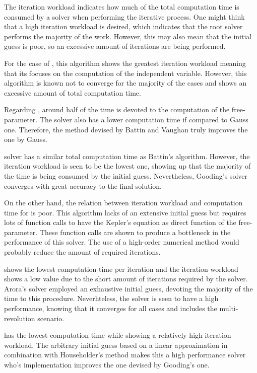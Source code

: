 The iteration workload indicates how much of the total computation time is
consumed by a solver when performing the iterative process. One might think that
a high iteration workload is desired, which indicates that the root solver
performs the majority of the work. However, this may also mean that the
initial guess is poor, so an excessive amount of iterations are being performed.

For the case of \cite{gauss1809}, this algorithm shows the greatest iteration
workload meaning that its focuses on the computation of the independent
variable. However, this algorithm is known not to converge for the majority of
the cases and shows an excessive amount of total computation time.

Regarding \cite{battin1984}, around half of the time is devoted to the
computation of the free-parameter. The solver also has a lower computation time
if compared to Gauss one. Therefore, the method devised by Battin and Vaughan
truly improves the one by Gauss.

\cite{gooding1990} solver has a similar total computation time as Battin's
algorithm. However, the iteration workload is seen to be the lowest one, showing
up that the majority of the time is being consumed by the initial guess.
Nevertheless, Gooding's solver converges with great accuracy to the final
solution.

On the other hand, the relation between iteration workload and computation time
for \cite{avanzini2008} is poor. This algorithm lacks of an extensive initial
guess but requires lots of function calls to have the Kepler's equation as
direct function of the free-parameter. These function calls are shown to produce
a bottleneck in the performance of this solver. The use of a high-order
numerical method would probably reduce the amount of required iterations.

\cite{arora2013} shows the lowest computation time per iteration and the
iteration workload shows a low value due to the short amount of iterations
required by the solver.  Arora's solver employed an exhaustive initial guess,
devoting the majority of the time to this procedure. Neverhteless, the solver is
seen to have a high performance, knowing that it converges for all cases and
includes the multi-revolution scenario. 

\cite{izzo2015} has the lowest computation time while showing a
relatively high iteration workload. The arbitrary initial guess based on a
linear approximation in combination with Householder's method makes this a high
performance solver who's implementation improves the one devised by Gooding's one.

